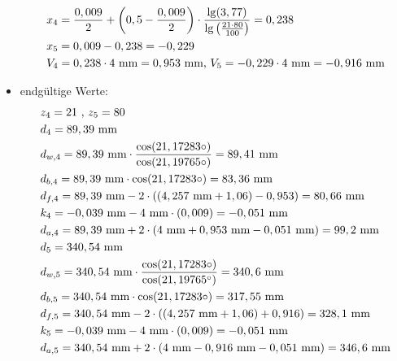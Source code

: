 \begin{itemize}
\begin{align*}
	&x_4 =\frac{0,009}{2} + \left( 0,5 - \frac{0,009}{2} \right) \cdot \frac{\lg(3,77)}{\lg\left( \frac{21 \cdot 80}{100} \right)} = 0,238 \\
	&x_5 = 0,009 - 0,238 = - 0,229 \\ 
	&V_4 = 0,238 \cdot 4 \text{ mm} = 0,953 \text{ mm, }V_5 = -0,229\cdot 4 \text{ mm} = -0,916 \text{ mm} 
\end{align*}
\item endgültige Werte:
\begin{align*}
	&z_4 = 21 \text{ , } z_5 = 80 \\
	&d_4 = 89,39 \text{ mm} \\
	&d_{w,4} = 89,39  \text{ mm}\cdot \frac{\cos(21,17283\circ)}{\cos(21,19765\circ)} = 89,41  \text{ mm}\\
	&d_{b,4} = 89,39  \text{ mm} \cdot \cos(21,17283\circ) = 83,36  \text{ mm}\\
	&d_{f,4} = 89,39  \text{ mm} -2 \cdot ((4,257 \text{ mm}+1,06)-0,953) = 80,66 \text{ mm}\\
	&k_4 = -0,039 \text{ mm} -4 \text{ mm} \cdot (0,009) =- 0,051 \text{ mm}\\
	&d_{a,4} = 89,39  \text{ mm} +2 \cdot (4\text{ mm}+0,953 \text{ mm} -0,051 \text{ mm}) = 99,2\text{ mm}\\
	&d_5 =340,54 \text{ mm} \\
	&d_{w,5} = 340,54  \text{ mm}\cdot \frac{\cos(21,17283\circ)}{\cos(21,19765^\circ)} = 340,6  \text{ mm}\\
	&d_{b,5} = 340,54  \text{ mm} \cdot \cos(21,17283\circ) = 317,55  \text{ mm}\\
	&d_{f,5} = 340,54  \text{ mm} -2 \cdot ((4,257 \text{ mm}+1,06)+0,916) = 328,1 \text{ mm}\\
	&k_5 = -0,039 \text{ mm} -4 \text{ mm} \cdot (0,009) =- 0,051 \text{ mm}\\
	&d_{a,5} = 340,54  \text{ mm} +2 \cdot (4\text{ mm}-0,916 \text{ mm} -0,051 \text{ mm}) = 346,6\text{ mm}
\end{align*}
\end{itemize}
